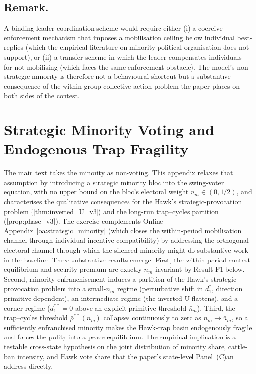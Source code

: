 \documentclass[11pt,twoside]{extarticle}
\begin{document}
\subsection*{Remark.} A binding leader-coordination scheme would require either (i) a coercive enforcement mechanism that imposes a mobilisation ceiling below individual best-replies (which the empirical literature on minority political organisation does not support), or (ii) a transfer scheme in which the leader compensates individuals for not mobilising (which faces the same enforcement obstacle). The model's non-strategic minority is therefore not a behavioural shortcut but a substantive consequence of the within-group collective-action problem the paper places on both sides of the contest.


\section{Strategic Minority Voting and Endogenous Trap Fragility}\label{oa:strategic_minority_voting}

The main text takes the minority as non-voting. This appendix relaxes that assumption by introducing a strategic minority bloc into the swing-voter equation, with no upper bound on the bloc's electoral weight $n_m\in(0,1/2)$, and characterises the qualitative consequences for the Hawk's strategic-provocation problem (\autoref{thm:inverted_U_v3}) and the long-run trap--cycles partition (\autoref{prop:phase_v3}). The exercise complements Online Appendix~\ref{oa:strategic_minority} (which closes the within-period mobilisation channel through individual incentive-compatibility) by addressing the orthogonal electoral channel through which the silenced minority might do substantive work in the baseline. Three substantive results emerge. First, the within-period contest equilibrium and security premium are exactly $n_m$-invariant by Result F1 below. Second, minority enfranchisement induces a partition of the Hawk's strategic-provocation problem into a small-$n_m$ regime (perturbative shift in $d_1^{*}$, direction primitive-dependent), an intermediate regime (the inverted-U flattens), and a corner regime ($d_1^{**}=0$ above an explicit primitive threshold $\bar n_m$). Third, the trap--cycles threshold $\bar\rho^{**}(n_m)$ collapses continuously to zero as $n_m\to\bar n_m$, so a sufficiently enfranchised minority makes the Hawk-trap basin endogenously fragile and forces the polity into a peace equilibrium. The empirical implication is a testable cross-state hypothesis on the joint distribution of minority share, cattle-ban intensity, and Hawk vote share that the paper's state-level Panel~(C)an address directly.
\end{document}
